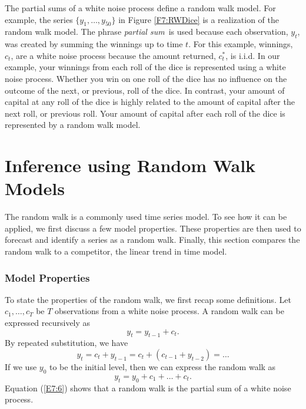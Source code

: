 The partial sums of a white noise process define a random walk
model. For example, the series $\{y_1, \ldots ,y_{50}\}$ in Figure
\ref{F7:RWDice} is a realization of the random walk model. The
phrase \emph{partial sum}\ is used because each observation, $y_t$,
was created by summing the winnings up to time $t$. For this
example, winnings, $c_t$, are a white noise process because the
amount returned, $c_t^{\ast}$, is i.i.d. In our example, your
winnings from each roll of the dice is represented using a white
noise process. Whether you win on one roll of the dice has no
influence on the outcome of the next, or previous, roll of the dice.
In contrast, your amount of capital at any roll of the dice is
highly related to the amount of capital after the next roll, or
previous roll. Your amount of capital after each roll of the dice is
represented by a random walk model.

\section{Inference using Random Walk Models}

The random walk is a commonly used time series model. To see how it
can be applied, we first discuss a few model properties. These
properties are then used to forecast and identify a series as a
random walk. Finally, this section compares the random walk to a
competitor, the linear trend in time model.

\subsubsection*{Model Properties}

To state the properties of the random walk, we first recap some
definitions. Let $c_1,\ldots ,c_T$ be $T$ observations from a white
noise process. A random walk can be expressed recursively as
\begin{equation} \label{E7:5}
y_t = y_{t-1} + c_t.
\end{equation}
By repeated substitution, we have
\begin{equation*}
y_t = c_t + y_{t-1} = c_t + \left( c_{t-1} + y_{t-2}\right) = \ldots
\end{equation*}
If we use $y_0$ to be the initial level, then we can express the
random
walk as%
\begin{equation}\label{E7:6}
y_t = y_0 + c_1 + \ldots + c_t.
\end{equation}
Equation (\ref{E7:6}) shows that a random walk is the partial sum of
a white noise process.

